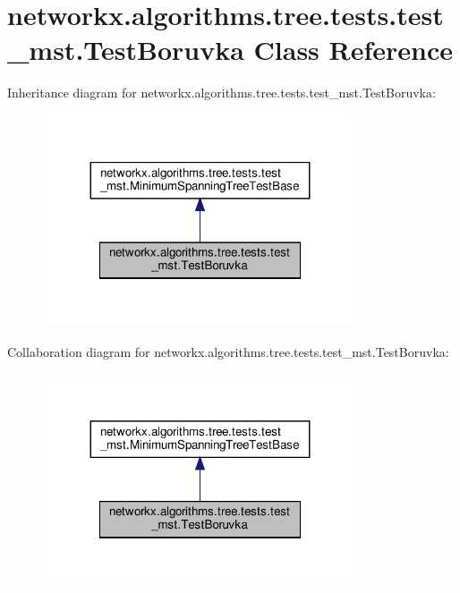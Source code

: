 \hypertarget{classnetworkx_1_1algorithms_1_1tree_1_1tests_1_1test__mst_1_1TestBoruvka}{}\section{networkx.\+algorithms.\+tree.\+tests.\+test\+\_\+mst.\+Test\+Boruvka Class Reference}
\label{classnetworkx_1_1algorithms_1_1tree_1_1tests_1_1test__mst_1_1TestBoruvka}


Inheritance diagram for networkx.\+algorithms.\+tree.\+tests.\+test\+\_\+mst.\+Test\+Boruvka\+:
\nopagebreak
\begin{figure}[H]
\begin{center}
\leavevmode
\includegraphics[width=263pt]{classnetworkx_1_1algorithms_1_1tree_1_1tests_1_1test__mst_1_1TestBoruvka__inherit__graph}
\end{center}
\end{figure}


Collaboration diagram for networkx.\+algorithms.\+tree.\+tests.\+test\+\_\+mst.\+Test\+Boruvka\+:
\nopagebreak
\begin{figure}[H]
\begin{center}
\leavevmode
\includegraphics[width=263pt]{classnetworkx_1_1algorithms_1_1tree_1_1tests_1_1test__mst_1_1TestBoruvka__coll__graph}
\end{center}
\end{figure}
